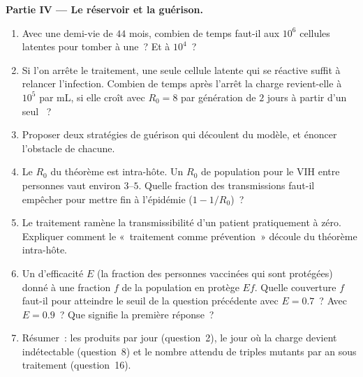 \begin{problem}
\medskip
\noindent\textbf{Partie IV --- Le réservoir et la guérison.}
\begin{enumerate}[resume]
  \item Avec une demi-vie de $44$ mois, combien de temps faut-il aux
        $10^{6}$ cellules latentes pour tomber à une~? Et à $10^{4}$~?
  \item Si l'on arrête le traitement, une seule cellule latente qui se
        réactive suffit à relancer l'infection. Combien de temps après
        l'arrêt la charge revient-elle à $10^{5}$ par mL, si elle croît
        avec $R_{0} = 8$ par génération de $2$ jours à partir d'un seul
        ~?
  \item Proposer deux stratégies de guérison qui découlent du modèle,
        et énoncer l'obstacle de chacune.
  \item Le $R_{0}$ du théorème est intra-hôte. Un $R_{0}$ de population
        pour le VIH entre personnes vaut environ $3$--$5$. Quelle
        fraction des transmissions faut-il empêcher pour mettre fin à
        l'épidémie ($1 - 1/R_{0}$)~?
  \item Le traitement ramène la transmissibilité d'un patient
        pratiquement à zéro. Expliquer comment le «~traitement comme
        prévention~» découle du théorème intra-hôte.
  \item Un  d'efficacité $E$ (la fraction des personnes vaccinées
        qui sont protégées) donné à une fraction $f$ de la population
        en protège $Ef$. Quelle couverture $f$ faut-il pour atteindre
        le seuil de la question précédente avec $E = 0.7$~? Avec
        $E = 0.9$~? Que signifie la première réponse~?
  \item Résumer~: les  produits par jour (question~2), le jour
        où la charge devient indétectable (question~8) et le nombre
        attendu de triples mutants par an sous traitement
        (question~16).
\end{enumerate}
\end{problem}
